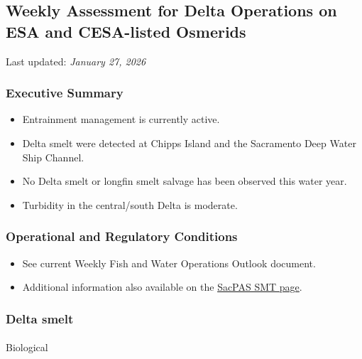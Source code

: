 \documentclass[
  letterpaper,
  DIV=11,
  numbers=noendperiod]{scrartcl}
\author{}
\date{}
\makeatletter
\let\oldparagraph\paragraph
\renewcommand{\paragraph}{
    \@ifstar
      \xxxParagraphStar
      \xxxParagraphNoStar
  }
\newcommand{\xxxParagraphStar}[1]{\oldparagraph*{#1}\mbox{}}
\newcommand{\xxxParagraphNoStar}[1]{\oldparagraph{#1}\mbox{}}
\providecommand{\tightlist}{%
  \setlength{\itemsep}{0pt}\setlength{\parskip}{0pt}}
\makeatother
\begin{document}
\subsection{Weekly Assessment for Delta Operations on ESA and
CESA-listed
Osmerids}\label{weekly-assessment-for-delta-operations-on-esa-and-cesa-listed-osmerids}

Last updated: \emph{January 27, 2026}

\subsubsection{Executive Summary}\label{executive-summary}

\begin{itemize}
\tightlist
\item
  Entrainment management is currently active.
\item
  Delta smelt were detected at Chipps Island and the Sacramento Deep
  Water Ship Channel.
\item
  No Delta smelt or longfin smelt salvage has been observed this water
  year.
\item
  Turbidity in the central/south Delta is moderate.
\end{itemize}

\subsubsection{Operational and Regulatory
Conditions}\label{operational-and-regulatory-conditions}

\begin{itemize}
\tightlist
\item
  See current Weekly Fish and Water Operations Outlook document.
\item
  Additional information also available on the
  \href{https://www.cbr.washington.edu/sacramento/workgroups/delta_smelt.html}{SacPAS
  SMT page}.
\end{itemize}

\subsubsection{Delta smelt}\label{delta-smelt}

\paragraph{Biological}\label{biological}
\end{document}
